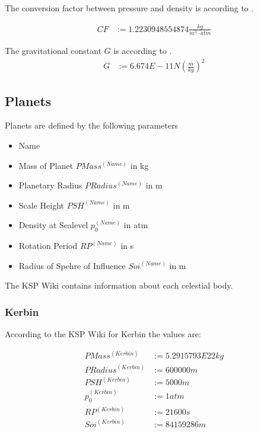 \documentclass[11pt]{article}
\begin{document}
The  conversion factor between pressure and
density is according to \cite{Atmo}.

\begin{align}
  CF &:= 1.2230948554874 \frac{kg}{m^3\cdot atm}
\end{align}

The  gravitational constant $G$ is according to \cite{ACB}.
\begin{align}
  G &:= 6.674E-11 N\left(\frac{m}{kg}\right)^2
\end{align}

\subsection{Planets}

Planets are defined by the following parameters

\begin{itemize}
\item Name
\item {} Mass of Planet $PMass^{(Name)}$ in kg
\item {} Planetary Radius $PRadius^{(Name)}$ in m
\item {} Scale Height $PSH^{(Name)}$ in m
\item {} Density at Sealevel $p_0^{(Name)}$ in atm
\item {} Rotation Period $RP^{(Name)}$ in s
\item {} Radius of Spehre of Influence $Soi^{(Name)}$ in m
\end{itemize}

The KSP Wiki \cite{Wiki} contains information about each celestial body.

\subsubsection{Kerbin}

According to the KSP Wiki for Kerbin the values are:

\begin{align*}
  PMass^{(Kerbin)} &:= 5.2915793E22 kg\\
  PRadius^{(Kerbin)} &:= 600000 m\\
  PSH^{(Kerbin)} &:= 5000 m\\
  p_0^{(Kerbin)} &:= 1 atm\\
  RP^{(Kerbin)} &:= 21600 s\\
  Soi^{(Kerbin)} &:= 84159286 m\\
\end{align*}
\end{document}
